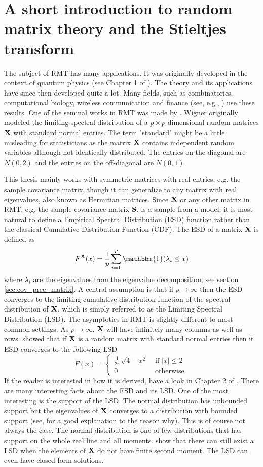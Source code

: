 \documentclass[12pt, twoside]{book}\usepackage{knitr}
\begin{document}
\section{A short introduction to random matrix theory and the Stieltjes transform}
The subject of RMT has many applications.
It was originally developed in the context of quantum physics (see Chapter 1 of \cite{mehta2004random}).
The theory and its applications have since then developed quite a lot.
Many fields, such as combinatorics, computational biology, wireless communication and finance (see, e.g., \cite{livan2018introduction}) use these results.
One of the seminal works in RMT was made by \citet{wigner1967random}. 
Wigner originally modeled the limiting spectral distribution of a $p \times p$ dimensional random matrices $\mathbf{X}$ with standard normal entries.
The term "standard" might be a little misleading for statisticians as the matrix $\mathbf{X}$ contains independent random variables although not identically distributed.
The entries on the diagonal are $N(0,2)$ and the entries on the off-diagonal are $N(0,1)$.

This thesis mainly works with symmetric matrices with real entries, e.g. the sample covariance matrix, though it can generalize to any matrix with real eigenvalues, also known as Hermitian matrices.
Since $\mathbf{X}$ or any other matrix in RMT, e.g. the sample covariance matrix $\mathbf{S}$, is a sample from a model, it is most natural to define a Empirical Spectral Distribution (ESD) function rather than the classical Cumulative Distribution Function (CDF).
The ESD of a matrix $\mathbf{X}$ is defined as
$$
F^{\bX}(x)= \frac{1}{p} \sum_{i=1}^p \mathbbm{1}(\lambda_i \leq x)
$$ 
where $\lambda_i$ are the eigenvalues from the eigenvalue decomposition, see section \ref{sec:cov_prec_matrix}.
A central assumption is that if $p \rightarrow \infty$ then the ESD converges to the limiting cumulative distribution function of the spectral distribution of $\mathbf{X}$, which is simply referred to as the Limiting Spectral Distribution (LSD).
The asymptotics in RMT is slightly different to most common settings.
As $p \rightarrow \infty$, $\mathbf{X}$ will have infinitely many columns as well as rows.
\citet{wigner1967random} showed that if $\mathbf{X}$ is a random matrix with standard normal entries then it ESD converges to the following LSD 
$$
F(x) = \begin{cases}
\frac{1}{2\pi} \sqrt{4-x^2} & \text{ if } |x|\leq 2 \\
0 & \text{ otherwise.}
\end{cases}
$$
If the reader is interested in how it is derived, have a look in Chapter 2 of \citet{bai2010spectral}.
There are many interesting facts about the ESD and its LSD. 
One of the most interesting is the support of the LSD.
The normal distribution has unbounded support but the eigenvalues of $\mathbf{X}$ converges to a distribution with bounded support (see, \citet{livan2018introduction} for a good explanation to the reason why).
This is of course not always the case.
The normal distribution is one of few distributions that has support on the whole real line and all moments.
\citet{burda2002free} show that there can still exist a LSD when the elements of $\mathbf{X}$ do not have finite second moment.
The LSD can even have closed form solutions.
\end{document}
